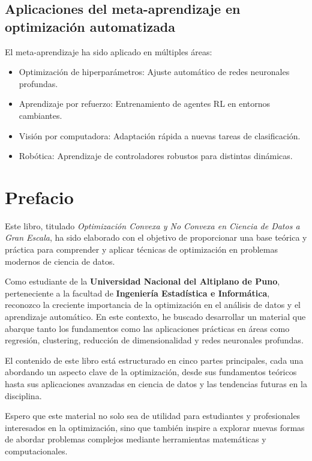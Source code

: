 \begin{itemize}
		\subsection{Aplicaciones del meta-aprendizaje en optimización automatizada}
		
		El meta-aprendizaje ha sido aplicado en múltiples áreas:
		
\begin{itemize}
			\item Optimización de hiperparámetros: Ajuste automático de redes neuronales profundas.
			\item Aprendizaje por refuerzo: Entrenamiento de agentes RL en entornos cambiantes.
			\item Visión por computadora: Adaptación rápida a nuevas tareas de clasificación.
			\item Robótica: Aprendizaje de controladores robustos para distintas dinámicas.
		\end{itemize}
\section*{Prefacio}
		
		Este libro, titulado \textit{Optimización Convexa y No Convexa en Ciencia de Datos a Gran Escala}, ha sido elaborado con el objetivo de proporcionar una base teórica y práctica para comprender y aplicar técnicas de optimización en problemas modernos de ciencia de datos.
		
		Como estudiante de la \textbf{Universidad Nacional del Altiplano de Puno}, perteneciente a la facultad de \textbf{Ingeniería Estadística e Informática}, reconozco la creciente importancia de la optimización en el análisis de datos y el aprendizaje automático. En este contexto, he buscado desarrollar un material que abarque tanto los fundamentos como las aplicaciones prácticas en áreas como regresión, clustering, reducción de dimensionalidad y redes neuronales profundas.
		
		El contenido de este libro está estructurado en cinco partes principales, cada una abordando un aspecto clave de la optimización, desde sus fundamentos teóricos hasta sus aplicaciones avanzadas en ciencia de datos y las tendencias futuras en la disciplina.
		
		Espero que este material no solo sea de utilidad para estudiantes y profesionales interesados en la optimización, sino que también inspire a explorar nuevas formas de abordar problemas complejos mediante herramientas matemáticas y computacionales.
		

\end{itemize}
